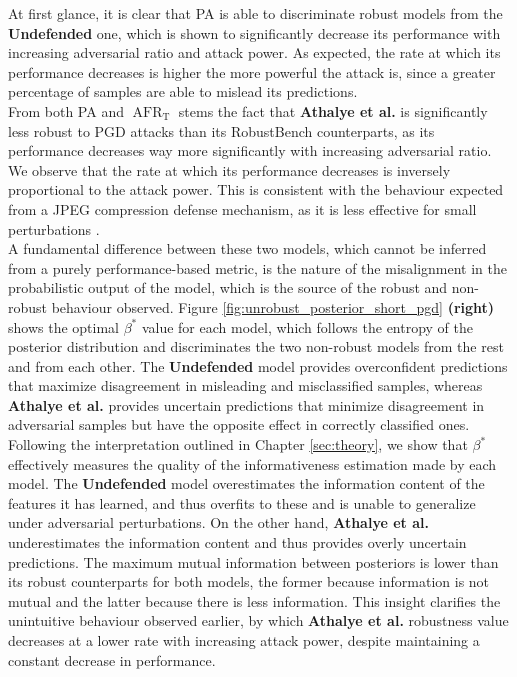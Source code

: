 At first glance, it is clear that PA is able to discriminate robust models from
the {\color{tab:orange} \textbf{Undefended}} one, which is shown to significantly
decrease its performance with increasing adversarial ratio and attack power. As expected, 
the rate at which its performance decreases is higher
the more powerful the attack is, since a greater percentage of samples are able to
mislead its predictions. \\

From both PA and $\operatorname{AFR}_{\text{T}}$ stems the fact that {\color{tab:green} \textbf{Athalye et al.}}
is significantly less robust to PGD attacks than its RobustBench counterparts, as 
its performance decreases way more significantly with increasing adversarial ratio. 
We observe that the rate at which its performance decreases is inversely proportional to the 
attack power. This is consistent with the behaviour expected from a JPEG compression defense 
mechanism, as it is less effective for small perturbations \cite{dasKeepingBadGuys2017}. \\

A fundamental difference between these two models, which cannot be
inferred from a purely performance-based metric, is the nature of the misalignment in
the probabilistic output of the model, which is the source of the robust and non-robust
behaviour observed. Figure \ref{fig:unrobust_posterior_short_pgd} \textbf{(right)}
shows the optimal $\beta^{*}$ value for each model, which follows
the entropy of the posterior distribution and discriminates the two non-robust
models from the rest and from each other. The {\color{tab:orange} \textbf{Undefended}}
model provides overconfident predictions that maximize disagreement in misleading and 
misclassified samples, whereas {\color{tab:green} \textbf{Athalye et al.}} provides 
uncertain predictions that minimize disagreement in adversarial samples but have 
the opposite effect in correctly classified ones. \\

Following the interpretation outlined in Chapter \ref{sec:theory}, we show that $\beta^{*}$ effectively measures the quality of 
the informativeness estimation made by each model. The {\color{tab:orange} \textbf{Undefended}} 
model overestimates the information content of the features it has learned, and thus overfits 
to these and is unable to generalize under adversarial perturbations. On the other hand, 
{\color{tab:green} \textbf{Athalye et al.}} underestimates the information content and thus
provides overly uncertain predictions. The maximum mutual information between posteriors is 
lower than its robust counterparts for both models, the former because information is not 
mutual and the latter because there is less information.
This insight clarifies the unintuitive behaviour observed earlier, by which {\color{tab:green} \textbf{Athalye et al.}} 
robustness value decreases at a lower rate with increasing attack power, despite maintaining a
constant decrease in performance. \\

